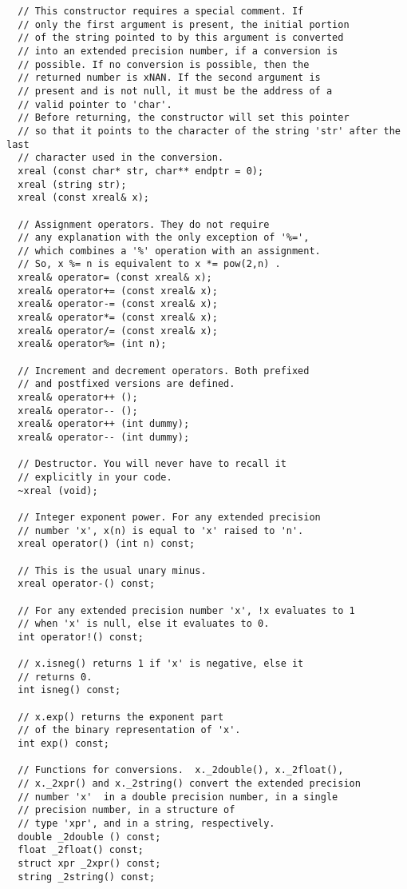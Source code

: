 \documentclass{article}
\begin{document}
\begin{verbatim}
  // This constructor requires a special comment. If
  // only the first argument is present, the initial portion
  // of the string pointed to by this argument is converted
  // into an extended precision number, if a conversion is
  // possible. If no conversion is possible, then the 
  // returned number is xNAN. If the second argument is
  // present and is not null, it must be the address of a 
  // valid pointer to 'char'.
  // Before returning, the constructor will set this pointer
  // so that it points to the character of the string 'str' after the last 
  // character used in the conversion.
  xreal (const char* str, char** endptr = 0);
  xreal (string str);
  xreal (const xreal& x);

  // Assignment operators. They do not require
  // any explanation with the only exception of '%=',
  // which combines a '%' operation with an assignment.
  // So, x %= n is equivalent to x *= pow(2,n) .
  xreal& operator= (const xreal& x);
  xreal& operator+= (const xreal& x);
  xreal& operator-= (const xreal& x);
  xreal& operator*= (const xreal& x);
  xreal& operator/= (const xreal& x);
  xreal& operator%= (int n);

  // Increment and decrement operators. Both prefixed
  // and postfixed versions are defined.
  xreal& operator++ ();
  xreal& operator-- ();
  xreal& operator++ (int dummy);
  xreal& operator-- (int dummy);

  // Destructor. You will never have to recall it
  // explicitly in your code.
  ~xreal (void);

  // Integer exponent power. For any extended precision
  // number 'x', x(n) is equal to 'x' raised to 'n'.
  xreal operator() (int n) const;

  // This is the usual unary minus.
  xreal operator-() const;

  // For any extended precision number 'x', !x evaluates to 1
  // when 'x' is null, else it evaluates to 0.
  int operator!() const;

  // x.isneg() returns 1 if 'x' is negative, else it 
  // returns 0.
  int isneg() const;

  // x.exp() returns the exponent part
  // of the binary representation of 'x'.
  int exp() const;

  // Functions for conversions.  x._2double(), x._2float(), 
  // x._2xpr() and x._2string() convert the extended precision
  // number 'x'  in a double precision number, in a single 
  // precision number, in a structure of
  // type 'xpr', and in a string, respectively.
  double _2double () const;
  float _2float() const;
  struct xpr _2xpr() const;
  string _2string() const;


\end{verbatim}
\end{document}
